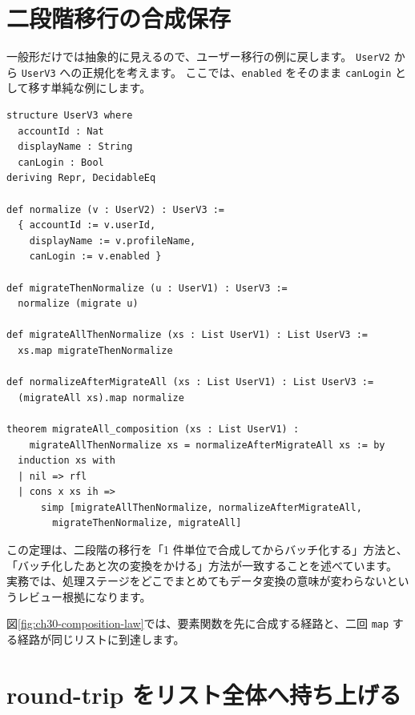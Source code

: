 \section{二段階移行の合成保存}

一般形だけでは抽象的に見えるので、ユーザー移行の例に戻します。
\texttt{UserV2} から \texttt{UserV3} への正規化を考えます。
ここでは、\texttt{enabled} をそのまま \texttt{canLogin} として移す単純な例にします。

\begin{listing}[htbp]
\begin{verbatim}
structure UserV3 where
  accountId : Nat
  displayName : String
  canLogin : Bool
deriving Repr, DecidableEq

def normalize (v : UserV2) : UserV3 :=
  { accountId := v.userId,
    displayName := v.profileName,
    canLogin := v.enabled }

def migrateThenNormalize (u : UserV1) : UserV3 :=
  normalize (migrate u)

def migrateAllThenNormalize (xs : List UserV1) : List UserV3 :=
  xs.map migrateThenNormalize

def normalizeAfterMigrateAll (xs : List UserV1) : List UserV3 :=
  (migrateAll xs).map normalize

theorem migrateAll_composition (xs : List UserV1) :
    migrateAllThenNormalize xs = normalizeAfterMigrateAll xs := by
  induction xs with
  | nil => rfl
  | cons x xs ih =>
      simp [migrateAllThenNormalize, normalizeAfterMigrateAll,
        migrateThenNormalize, migrateAll]
\end{verbatim}
\caption{\texttt{migrateAll\_composition}}
\label{lst:ch30-two-step-migration}
\end{listing}

この定理は、二段階の移行を「1 件単位で合成してからバッチ化する」方法と、「バッチ化したあと次の変換をかける」方法が一致することを述べています。
実務では、処理ステージをどこでまとめてもデータ変換の意味が変わらないというレビュー根拠になります。

図\ref{fig:ch30-composition-law}では、要素関数を先に合成する経路と、二回 \texttt{map} する経路が同じリストに到達します。


\section{round-trip をリスト全体へ持ち上げる}

